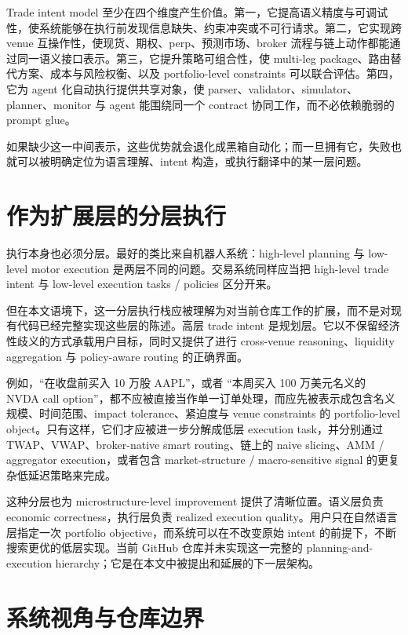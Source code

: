 \documentclass{article}
\begin{document}
Trade intent model 至少在四个维度产生价值。第一，它提高语义精度与可调试性，使系统能够在执行前发现信息缺失、约束冲突或不可行请求。第二，它实现跨 venue 互操作性，使现货、期权、perp、预测市场、broker 流程与链上动作都能通过同一语义接口表示。第三，它提升策略可组合性，使 multi-leg package、路由替代方案、成本与风险权衡、以及 portfolio-level constraints 可以联合评估。第四，它为 agent 化自动执行提供共享对象，使 parser、validator、simulator、planner、monitor 与 agent 能围绕同一个 contract 协同工作，而不必依赖脆弱的 prompt glue。

如果缺少这一中间表示，这些优势就会退化成黑箱自动化；而一旦拥有它，失败也就可以被明确定位为语言理解、intent 构造，或执行翻译中的某一层问题。

\section{作为扩展层的分层执行}

执行本身也必须分层。最好的类比来自机器人系统：high-level planning 与 low-level motor execution 是两层不同的问题。交易系统同样应当把 high-level trade intent 与 low-level execution tasks / policies 区分开来。

但在本文语境下，这一分层执行栈应被理解为对当前仓库工作的扩展，而不是对现有代码已经完整实现这些层的陈述。高层 trade intent 是规划层。它以不保留经济性歧义的方式承载用户目标，同时又提供了进行 cross-venue reasoning、liquidity aggregation 与 policy-aware routing 的正确界面。

例如，``在收盘前买入 10 万股 AAPL''，或者 ``本周买入 100 万美元名义的 NVDA call option''，都不应被直接当作单一订单处理，而应先被表示成包含名义规模、时间范围、impact tolerance、紧迫度与 venue constraints 的 portfolio-level object。只有这样，它们才应被进一步分解成低层 execution task，并分别通过 TWAP、VWAP、broker-native smart routing、链上的 naive slicing、AMM / aggregator execution，或者包含 market-structure / macro-sensitive signal 的更复杂低延迟策略来完成。

这种分层也为 microstructure-level improvement 提供了清晰位置。语义层负责 economic correctness，执行层负责 realized execution quality。用户只在自然语言层指定一次 portfolio objective，而系统可以在不改变原始 intent 的前提下，不断搜索更优的低层实现。当前 GitHub 仓库并未实现这一完整的 planning-and-execution hierarchy；它是在本文中被提出和延展的下一层架构。

\section{系统视角与仓库边界}
\end{document}
